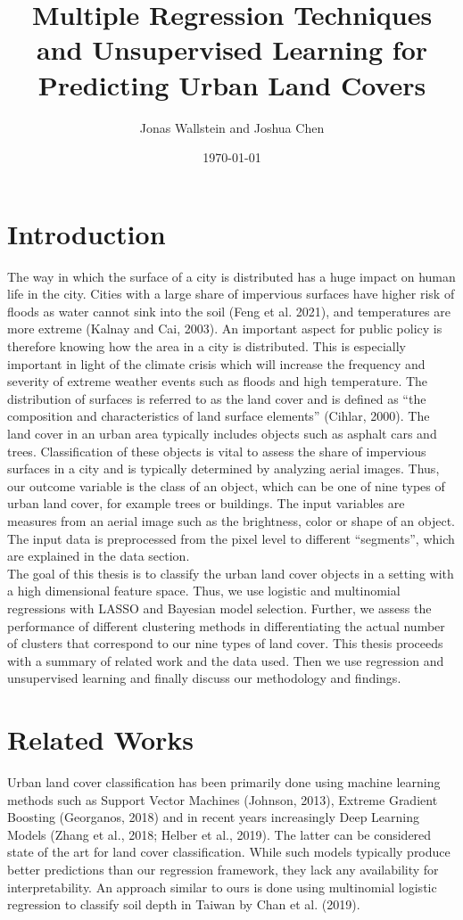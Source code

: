 \documentclass[11pt]{article}
\title{Multiple Regression Techniques and Unsupervised Learning for Predicting Urban Land Covers}
\author{Jonas Wallstein and Joshua Chen}
\date{\today}
\begin{document}
\setlength{\parindent}{0pt}
\maketitle

\tableofcontents

\newpage
\section{Introduction}
The way in which the surface of a city is distributed has a huge impact on human life in the city. Cities with a large share of impervious surfaces have higher risk of floods as water cannot sink into the soil (Feng et al. 2021), and temperatures are more extreme (Kalnay and Cai, 2003). An important aspect for public policy is therefore knowing how the area in a city is distributed. This is especially important in light of the climate crisis which will increase the frequency and severity of extreme weather events such as floods and high temperature.
The distribution of surfaces is referred to as the land cover and is defined as “the composition and characteristics of land surface elements” (Cihlar, 2000). The land cover in an urban area typically includes objects such as asphalt cars and trees. Classification of these objects is vital to assess the share of impervious surfaces in a city and is typically determined by analyzing aerial images. Thus, our outcome variable is the class of an object, which can be one of nine types of urban land cover, for example trees or buildings. The input variables are measures from an aerial image such as the brightness, color or shape of an object. The input data is preprocessed from the pixel level to different “segments”, which are explained in the data section.\\

The goal of this thesis is to classify the urban land cover objects in a setting with a high dimensional feature space. Thus, we use logistic and multinomial regressions with LASSO and Bayesian model selection. Further, we assess the performance of different clustering methods in differentiating the actual number of clusters that correspond to our nine types of land cover. This thesis proceeds with a summary of related work and the data used. Then we use regression and unsupervised learning and finally discuss our methodology and findings.

\section{Related Works}
Urban land cover classification has been primarily done using machine learning methods such as Support Vector Machines (Johnson, 2013), Extreme Gradient Boosting (Georganos, 2018) and in recent years increasingly Deep Learning Models (Zhang et al., 2018; Helber et al., 2019). The latter can be considered state of the art for land cover classification. While such models typically produce better predictions than our regression framework, they lack any availability for interpretability. An approach similar to ours is done using multinomial logistic regression to classify soil depth in Taiwan by Chan et al. (2019).
\end{document}
